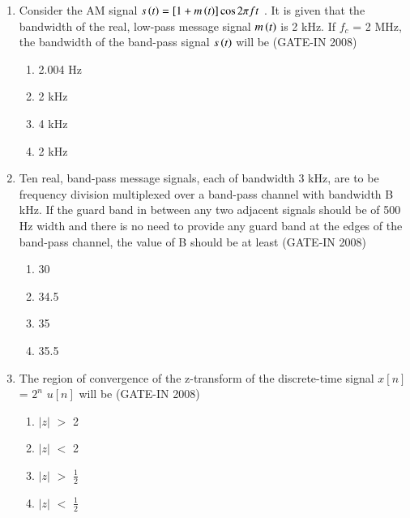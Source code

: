 \documentclass[journal,12pt,onecolumn]{IEEEtran}
\theoremstyle{remark}
\begin{document}
\begin{enumerate}
   \item Consider the AM signal $s\left(t\right) = [1+ m\left(t\right)]\cos{2{\pi}ft}$ . It is given that the bandwidth of the real, low-pass message signal $m\left(t\right)$ is 2 kHz. If $f_{c}$ = 2 MHz, the bandwidth of the band-pass signal $s\left(t\right)$ will be \hfill{(GATE-IN 2008)}
\begin{multicols}{4}
    \begin{enumerate} 
            \item  2.004 Hz
            \item  2 kHz
            \item  4 kHz
            \item  2 kHz
     \end{enumerate}
     \end{multicols}

         \item Ten real, band-pass message signals, each of bandwidth 3 kHz, are to be frequency division multiplexed over a band-pass channel with bandwidth B kHz. If the guard band in between any two adjacent signals should be of 500 Hz width and there is no need to provide any guard band at the edges of the band-pass channel, the value of B should be at least \hfill{(GATE-IN 2008)}
\begin{multicols}{4}
          \begin{enumerate} 
              \item  30
              \item  34.5
              \item  35
              \item  35.5
           \end{enumerate}
           \end{multicols}

\item The region of convergence of the z-transform of the discrete-time signal $x[n]$ = $2^{n}$ $u[n]$ will be  \hfill{(GATE-IN 2008)}
\begin{multicols}{4}
          \begin{enumerate} 
              \item  \( |z| \) $>$ 2
              \item  \( |z| \) $<$ 2
              \item  \( |z| \) $>$ $\frac{1}{2}$
              \item  \( |z| \) $<$ $\frac{1}{2}$
           \end{enumerate}
           \end{multicols}



\end{enumerate}
\end{document}
